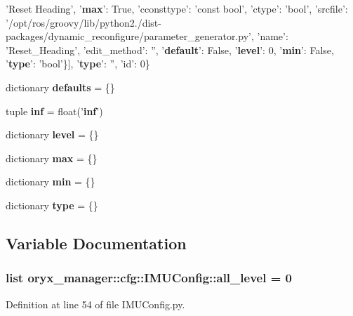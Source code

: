 \begin{DoxyCompactItemize}
'\-Reset \-Heading', '{\bf max}'\-: \-True, 'cconsttype'\-: 'const bool', 'ctype'\-: 'bool', 'srcfile'\-: '/opt/ros/groovy/lib/python2./dist-\/packages/dynamic\-\_\-reconfigure/parameter\-\_\-generator.\-py', 'name'\-: '\-Reset\-\_\-\-Heading', 'edit\-\_\-method'\-: '', '{\bf default}'\-: \-False, '{\bf level}'\-: 0, '{\bf min}'\-: \-False, '{\bf type}'\-: 'bool'\}], '{\bf type}'\-: '', 'id'\-: 0\}
\item 
dictionary {\bf defaults} = \{\}
\item 
tuple {\bf inf} = float('{\bf inf}')
\item 
dictionary {\bf level} = \{\}
\item 
dictionary {\bf max} = \{\}
\item 
dictionary {\bf min} = \{\}
\item 
dictionary {\bf type} = \{\}
\end{DoxyCompactItemize}


\subsection{\-Variable \-Documentation}
\subsubsection[{all\-\_\-level}]{\setlength{\rightskip}{0pt plus 5cm}list {\bf oryx\-\_\-manager\-::cfg\-::\-I\-M\-U\-Config\-::all\-\_\-level} = 0}\label{namespaceoryx__manager_1_1cfg_1_1IMUConfig_a9065acd57c3108640d1e6a42490b30cd}


\-Definition at line 54 of file \-I\-M\-U\-Config.\-py.

